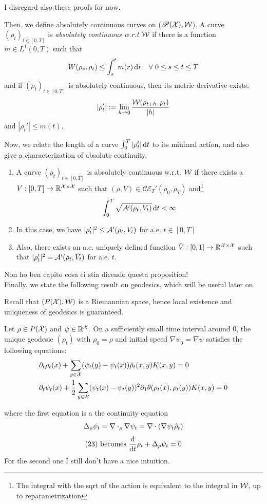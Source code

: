 I disregard also these proofs for now. 

Then, we define absolutely continuous curves on ($\mathscr{P}(\mathcal{X}),\mathcal{W}$). A curve $(\rho_t)_{t\in[0,T]}$ is \emph{absolutely continuous w.r.t $\mathcal{W}$} if there is a function $m \in L^1(0,T)$ such that
\[
W(\rho_s,\rho_t) \le \int_s^t m(r) \mathop{}\!\mathrm{d} r \quad \forall\,\, 0\le s \le t\le T
\]
and if $(\rho_t)_{t\in[0,T]}$ is absolutely continuous, then its metric derivative exists:
\[
|\rho_t'|:=\lim_{h\to0}\frac{\mathcal{W}(\rho_{t+h},\rho_t)}{|h|}
\]
and $|\rho_t'|\le m(t)$.

Now, we relate the length of a curve $\int_0^T|\rho_t'| \mathop{}\!\mathrm{d} t$ to its minimal action, and also give a characterization of absolute continuity. 

\begin{proposition}
    \begin{enumerate}[label=($\roman*$)]
        \item A curve $(\rho_t)_{t\in[0,T]}$ is absolutely continuous w.r.t. $\mathcal{W}$ if there exists a $V:[0,T]\to\mathbb{R}^{\mathcal{X}\times\mathcal{X}}$ such that $(\rho,V) \in \mathcal{CE}_T'(\rho_0,\rho_T)$ and\footnote{The integral with the sqrt of the action is equivalent to the integral in $\mathcal{W}$, up to reparametrization} \[
        \int_0^T \sqrt{\mathcal{A}'(\rho_t,V_t)} \mathop{}\!\mathrm{d} t < \infty
        \]
        \item In this case, we have $|\rho'_t|^2 \le \mathcal{A}'(\rho_t,V_t)$ for a.e. $t\in[0,T]$
        \item Also, there exists an a.e. uniquely defined function $\tilde V:[0,1]\to \mathbb{R}^{\mathcal{X}\times\mathcal{X}}$ such that $|\rho'_t|^2 = \mathcal{A}'(\rho_t,\tilde V_t)$ for a.e. $t$.
    \end{enumerate}
\end{proposition}

Non ho ben capito cosa ci stia dicendo questa proposition!
\\

Finally, we state the following result on geodesics, which will be useful later on. 

Recall that $(P(\mathcal{X}),\mathcal{W})$ is a Riemannian space, hence local existence and uniqueness of geodesics is guaranteed. 
\begin{proposition}\label{eq: formulas}
    Let $\rho \in P(\mathcal{X})$ and $\psi \in \mathbb{R}^{\mathcal{X}}$. On a sufficiently small time interval around 0, the unique geodesic $(\rho_t)$ with $\rho_0=\rho$ and initial speed $\nabla \psi_0=\nabla \psi$ satisfies the following equations:
    \begin{align}
        &\partial_t\rho_t(x) +\sum_{y\in\mathcal{X}}(\psi_t(y)-\psi_t(x)) \hat\rho_t(x,y) K(x,y)=0\\
        &\partial_t\psi_t(x) + \frac{1}{2}\sum_{y\in\mathcal{X}} (\psi_t(x)-\psi_t(y))^2 \partial_1\theta(\rho_t(x),\rho_t(y))K(x,y)=0
    \end{align}
\end{proposition}
where the first equation is a the continuity equation \[
\Delta_\rho\psi_t=\nabla \cdot_\rho \nabla \psi_t = \nabla \cdot(\nabla \psi_t \hat \rho_t)
\]
\[
(23) \text{ becomes } \frac{\mathop{}\!\mathrm{d}}{\mathop{}\!\mathrm{d} t} \rho_t + \Delta_\rho \psi_t = 0
\]
For the second one I still don't have a nice intuition. 

